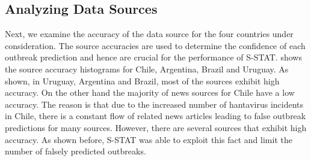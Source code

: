 \documentclass[conference]{IEEEtran}
\newcommand{\fullmodel}{{S-STAT}\xspace}
\begin{document}
\subsection{Analyzing Data Sources}
Next, we examine the accuracy of the data source for the four countries under consideration. The source accuracies are used to determine the confidence of each outbreak prediction and hence are crucial for the performance of \fullmodel.  shows the source accuracy histograms for Chile, Argentina, Brazil and Uruguay. As shown, in Uruguay, Argentina and Brazil, most of the sources exhibit high accuracy. On the other hand the majority of news sources for Chile have a low accuracy. The reason is that due to the increased number of hantavirus incidents in Chile, there is a constant flow of related news articles leading to false outbreak predictions for many sources. However, there are several sources that exhibit high accuracy. As shown before, \fullmodel was able to exploit this fact and limit the number of falsely predicted outbreaks.
\end{document}
